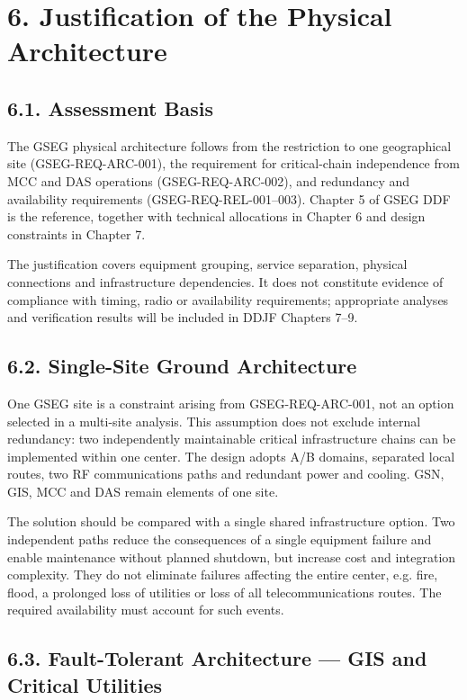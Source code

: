 \section{6. Justification of the Physical Architecture}\label{ddjf-6}

\subsection{6.1. Assessment Basis}\label{ddjf-6-1}

The GSEG physical architecture follows from the restriction to one geographical site (GSEG-REQ-ARC-001), the requirement for critical-chain independence from MCC and DAS operations (GSEG-REQ-ARC-002), and redundancy and availability requirements (GSEG-REQ-REL-001–003). Chapter 5 of GSEG DDF is the reference, together with technical allocations in Chapter 6 and design constraints in Chapter 7.

The justification covers equipment grouping, service separation, physical connections and infrastructure dependencies. It does not constitute evidence of compliance with timing, radio or availability requirements; appropriate analyses and verification results will be included in DDJF Chapters 7–9.

\subsection{6.2. Single-Site Ground Architecture}\label{ddjf-6-2}

One GSEG site is a constraint arising from GSEG-REQ-ARC-001, not an option selected in a multi-site analysis. This assumption does not exclude internal redundancy: two independently maintainable critical infrastructure chains can be implemented within one center. The design adopts A/\allowbreak{}B domains, separated local routes, two RF communications paths and redundant power and cooling. GSN, GIS, MCC and DAS remain elements of one site.

The solution should be compared with a single shared infrastructure option. Two independent paths reduce the consequences of a single equipment failure and enable maintenance without planned shutdown, but increase cost and integration complexity. They do not eliminate failures affecting the entire center, e.g. fire, flood, a prolonged loss of utilities or loss of all telecommunications routes. The required availability must account for such events.

\subsection{6.3. Fault-Tolerant Architecture — GIS and Critical Utilities}\label{ddjf-6-3}

